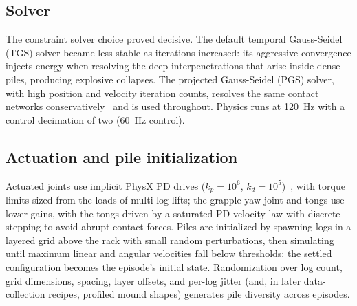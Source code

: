 \subsection{Solver}

The constraint solver choice proved decisive. The default temporal
Gauss-Seidel (TGS) solver became less stable as iterations increased: its
aggressive convergence injects energy when resolving the deep
interpenetrations that arise inside dense piles, producing explosive
collapses. The projected Gauss-Seidel (PGS) solver, with high position and
velocity iteration counts, resolves the same contact networks
conservatively~\cite{nvidia_solver} and is used throughout. Physics runs at
120~Hz with a control decimation of two (60~Hz control).

\subsection{Actuation and pile initialization}

Actuated joints use implicit PhysX PD drives ($k_p = 10^6$,
$k_d = 10^5$)~\cite{nvidia_joints}, with torque limits sized from the loads of
multi-log lifts; the grapple yaw joint and tongs use lower gains, with the
tongs driven by a saturated PD velocity law with discrete stepping to avoid
abrupt contact forces. Piles are initialized by spawning logs in a layered
grid above the rack with small random perturbations, then simulating until
maximum linear and angular velocities fall below thresholds; the settled
configuration becomes the episode's initial state. Randomization over log
count, grid dimensions, spacing, layer offsets, and per-log jitter (and, in
later data-collection recipes, profiled mound shapes) generates pile
diversity across episodes.

